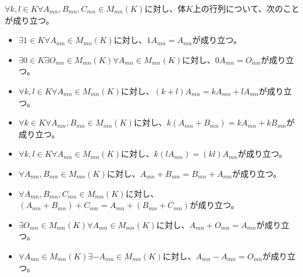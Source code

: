 \documentclass[dvipdfmx]{jsarticle}
\begin{document}
\begin{thm}\label{4.1.2.7}
$\forall k,l \in K\forall A_{mn},B_{mn},C_{mn} \in M_{mn}(K)$に対し、体$K$上の行列について、次のことが成り立つ。
\begin{itemize}
\item
  $\exists 1 \in K\forall A_{mn} \in M_{mn}(K)$に対し、$1A_{mn} = A_{mn}$が成り立つ。
\item
  $\exists 0 \in K\exists O_{mn} \in M_{mn}(K)\forall A_{mn} \in M_{mn}(K)$に対し、$0A_{mn} = O_{mn}$が成り立つ。
\item
  $\forall k,l \in K\forall A_{mn} \in M_{mn}(K)$に対し、$(k + l)A_{mn} = kA_{mn} + lA_{mn}$が成り立つ。
\item
  $\forall k \in K\forall A_{mn},B_{mn} \in M_{mn}(K)$に対し、$k\left( A_{mn} + B_{mn} \right) = kA_{mn} + kB_{mn}$が成り立つ。
\item
  $\forall k,l \in K\forall A_{mn} \in M_{mn}(K)$に対し、$k\left( lA_{mn} \right) = (kl)A_{mn}$が成り立つ。
\item
  $\forall A_{mn},B_{mn} \in M_{mn}(K)$に対し、$A_{mn} + B_{mn} = B_{mn} + A_{mn}$が成り立つ。
\item
  $\forall A_{mn},B_{mn},C_{mn} \in M_{mn}(K)$に対し、$\left( A_{mn} + B_{mn} \right) + C_{mn} = A_{mn} + \left( B_{mn} + C_{mn} \right)$が成り立つ。
\item
  $\exists O_{mn} \in M_{mn}(K)\forall A_{mn} \in M_{mn}(K)$に対し、$A_{mn} + O_{mn} = A_{mn}$が成り立つ。
\item
  $\forall A_{mn} \in M_{mn}(K)\exists - A_{mn} \in M_{mn}(K)$に対し、$A_{mn} - A_{mn} = O_{mn}$が成り立つ。
\end{itemize}
\end{thm}
\end{document}
